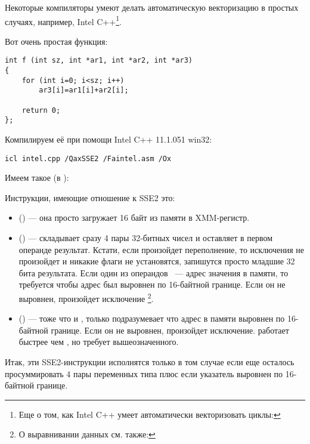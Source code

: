 Некоторые компиляторы умеют делать автоматическую векторизацию в простых случаях, 
например, Intel C++\footnote{Еще о том, как Intel C++ умеет автоматически векторизовать циклы: \URLINTELVEC}.

Вот очень простая функция:

\begin{lstlisting}[style=customc]
int f (int sz, int *ar1, int *ar2, int *ar3)
{
	for (int i=0; i<sz; i++)
		ar3[i]=ar1[i]+ar2[i];

	return 0;
};
\end{lstlisting}


Компилируем её при помощи Intel C++ 11.1.051 win32:

\begin{verbatim}
icl intel.cpp /QaxSSE2 /Faintel.asm /Ox
\end{verbatim}

Имеем такое (в \IDA):



Инструкции, имеющие отношение к SSE2 это:
\begin{itemize}
\item
\MOVDQU () --- она просто загружает 16 байт из памяти в XMM-регистр.

\item
\PADDD () --- складывает сразу 4 пары 32-битных чисел и оставляет в первом операнде результат. 
Кстати, если произойдет переполнение, то исключения не произойдет и никакие флаги не установятся, 
запишутся просто младшие 32 бита результата. 
Если один из операндов \PADDD ~--- адрес значения в памяти, 
то требуется чтобы адрес был выровнен по 16-байтной границе. Если он не выровнен, произойдет исключение
\footnote{О выравнивании данных см. также: \URLWPDA}.

\item
\MOVDQA () --- тоже что и \MOVDQU, только подразумевает 
что адрес в памяти выровнен по 16-байтной границе. 
Если он не выровнен, произойдет исключение. 
\MOVDQA работает быстрее чем \MOVDQU, но требует вышеозначенного.

\end{itemize}

Итак, эти SSE2-инструкции исполнятся только в том случае если еще осталось просуммировать 
4 пары переменных типа \Tint плюс если указатель  выровнен по 16-байтной границе.

